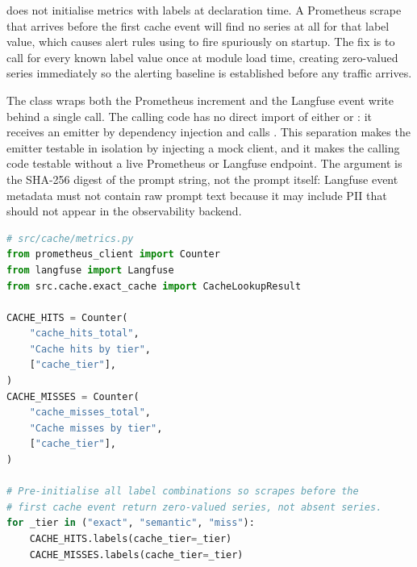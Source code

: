 \begin{notebox}
 does not initialise metrics with labels at
declaration time. A Prometheus scrape that arrives before the first cache
event will find no series at all for that label value, which causes alert
rules using  to fire spuriously on startup. The fix is to
call  for every known label value once at module load
time, creating zero-valued series immediately so the alerting baseline is
established before any traffic arrives.
\end{notebox}

The  class wraps both the Prometheus increment
and the Langfuse event write behind a single  call. The
calling code has no direct import of either  or
: it receives an emitter by dependency injection and calls
. This separation makes the emitter
testable in isolation by injecting a mock  client, and it
makes the calling code testable without a live Prometheus or Langfuse
endpoint. The  argument is the SHA-256 digest of the
prompt string, not the prompt itself: Langfuse event metadata must not
contain raw prompt text because it may include PII that should not appear
in the observability backend.

\begin{lstlisting}[language=Python,
  caption={Module-level counters with label pre-initialisation},
  label={lst:prom-counters}]
# src/cache/metrics.py
from prometheus_client import Counter
from langfuse import Langfuse
from src.cache.exact_cache import CacheLookupResult

CACHE_HITS = Counter(
    "cache_hits_total",
    "Cache hits by tier",
    ["cache_tier"],
)
CACHE_MISSES = Counter(
    "cache_misses_total",
    "Cache misses by tier",
    ["cache_tier"],
)

# Pre-initialise all label combinations so scrapes before the
# first cache event return zero-valued series, not absent series.
for _tier in ("exact", "semantic", "miss"):
    CACHE_HITS.labels(cache_tier=_tier)
    CACHE_MISSES.labels(cache_tier=_tier)
\end{lstlisting}

